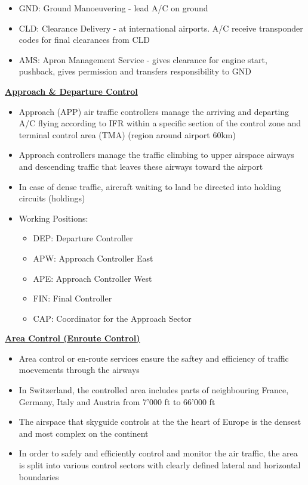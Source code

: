 \documentclass[9pt, landscape, fleqn]{scrartcl}
\begin{document}
\begin{multicols*}{3}
\begin{itemize}
\begin{itemize}
        \item GND: Ground Manoeuvering - lead A/C on ground
        \item CLD: Clearance Delivery - at international airports. A/C receive transponder codes for final clearances from CLD 
        \item AMS: Apron Management Service - gives clearance for engine start, pushback, gives permission and transfers responsibility to GND 
    \end{itemize}
\end{itemize}
\underline{\textbf{Approach \& Departure Control}}
\begin{itemize}
    \item Approach (APP) air traffic controllers manage the arriving and departing A/C flying according to IFR within a specific section of the control zone and terminal control area (TMA) (region around airport 60km)
    \item Approach controllers manage the traffic climbing to upper airspace airways and descending traffic that leaves these airways toward the airport 
    \item In case of dense traffic, aircraft waiting to land be directed into holding circuits (holdings)
    \item Working Positions:
    \begin{itemize}
        \item DEP: Departure Controller 
        \item APW: Approach Controller East 
        \item APE: Approach Controller West
        \item FIN: Final Controller 
        \item CAP: Coordinator for the Approach Sector 
    \end{itemize}
\end{itemize}
\underline{\textbf{Area Control (Enroute Control)}}
\begin{itemize}
    \item Area control or en-route services ensure the saftey and efficiency of traffic moevements through the airways 
    \item In Switzerland, the controlled area includes parts of neighbouring France, Germany, Italy and Austria from 7'000 ft to 66'000 ft
    \item The airspace that skyguide controls at the the heart of Europe is the densest and most complex on the continent 
    \item In order to safely and efficiently control and monitor the air traffic, the area is split into various control sectors with clearly defined lateral and horizontal boundaries 

\end{itemize}
\end{multicols*}
\end{document}
